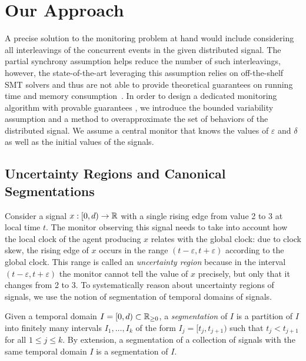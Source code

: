 \section{Our Approach}

A precise solution to the monitoring problem at hand would include considering all interleavings of the concurrent events in the given distributed signal.
The partial synchrony assumption helps reduce the number of such interleavings, however, the state-of-the-art leveraging this assumption relies on off-the-shelf SMT solvers and thus are not able to provide theoretical guarantees on running time and memory consumption~\cite{GangulyMB20,MomtazAB23}.
In order to design a dedicated monitoring algorithm with provable guarantees , we introduce the bounded variability assumption and a method to overapproximate the set of behaviors of the distributed signal.
We assume a central monitor that knows the values of $\varepsilon$ and $\delta$ as well as the initial values of the signals.


\subsection{Uncertainty Regions and Canonical Segmentations} \label{sec:segment}

Consider a signal $x : [0,d) \to \mathbb{R}$ with a single rising edge from value 2 to 3 at local time $t$.
The monitor observing this signal needs to take into account how the local clock of the agent producing $x$ relates with the global clock: due to clock skew, the rising edge of $x$ occurs in the range $(t - \varepsilon, t + \varepsilon)$ according to the global clock.
This range is called an \emph{uncertainty region} because in the interval $(t - \varepsilon, t + \varepsilon)$ the monitor cannot tell the value of $x$ precisely, but only that it changes from 2 to 3.
To systematically reason about uncertainty regions of signals, we use the notion of segmentation of temporal domains of signals.

Given a temporal domain $I = [0,d) \subset \mathbb{R}_{\geq 0}$, a \emph{segmentation} of $I$ is a partition of $I$ into finitely many intervals $I_1, \ldots, I_k$ of the form $I_j = [t_j, t_{j+1})$ such that $t_j < t_{j+1}$ for all $1 \leq j \leq k$.
By extension, a segmentation of a collection of signals with the same temporal domain $I$ is a segmentation of $I$. 

